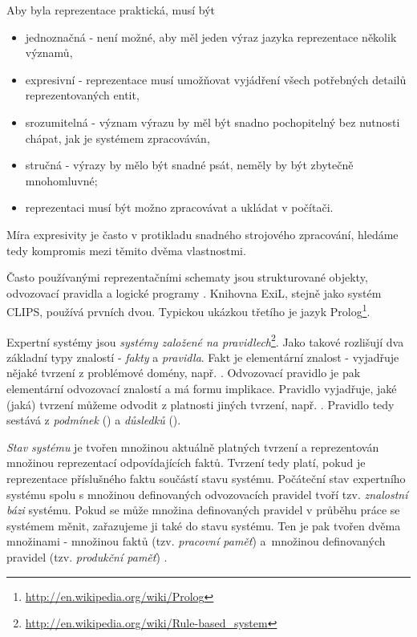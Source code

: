 Aby byla reprezentace praktická, musí být \cite{introduction}
\begin{itemize}
  \item jednoznačná - není možné, aby měl jeden výraz jazyka reprezentace
    několik významů,
  \item expresivní - reprezentace musí umožňovat vyjádření všech potřebných
    detailů reprezentovaných entit,
  \item srozumitelná - význam výrazu by měl být snadno pochopitelný bez
    nutnosti chápat, jak je systémem zpracováván,
  \item stručná - výrazy by mělo být snadné psát, neměly by být zbytečně
    mnohomluvné;
  \item reprezentaci musí být možno zpracovávat a ukládat v počítači.
\end{itemize}
Míra expresivity je často v protikladu snadného strojového zpracování, hledáme
tedy kompromis mezi těmito dvěma vlastnostmi.

Často používanými reprezentačními schematy jsou strukturované objekty,
odvozovací pravidla a logické programy \cite{introduction}. Knihovna ExiL, stejně jako systém CLIPS,
používá prvních dvou. Typickou ukázkou třetího je jazyk
Prolog\footnote{\url{http://en.wikipedia.org/wiki/Prolog}}.

Expertní systémy jsou \emph{systémy založené na
pravidlech}\footnote{\url{http://en.wikipedia.org/wiki/Rule-based\_system}}.
Jako takové rozlišují dva základní typy znalostí - \emph{fakty} a
\emph{pravidla}. Fakt je elementární  znalost - vyjadřuje nějaké
tvrzení z problémové domény, např. . Odvozovací pravidlo je
pak elementární odvozovací znalostí a má formu implikace. Pravidlo vyjadřuje,
jaké (jaká) tvrzení můžeme odvodit z platnosti jiných tvrzení, např. . Pravidlo tedy sestává z \emph{podmínek} () a \emph{důsledků} ().

\emph{Stav systému} je tvořen množinou aktuálně platných tvrzení a reprezentován
množinou reprezentací odpovídajících faktů. Tvrzení tedy platí, pokud je
reprezentace příslušného faktu součástí stavu systému. Počáteční stav expertního
systému spolu s množinou definovaných odvozovacích pravidel tvoří tzv.
\emph{znalostní bázi} systému. Pokud se může množina definovaných pravidel v
průběhu práce se systémem měnit, zařazujeme ji také do stavu systému. Ten je pak
tvořen dvěma množinami - množinou faktů (tzv.  \emph{pracovní paměť}) a~množinou
definovaných pravidel (tzv. \emph{produkční paměť}) \cite{introduction}.


